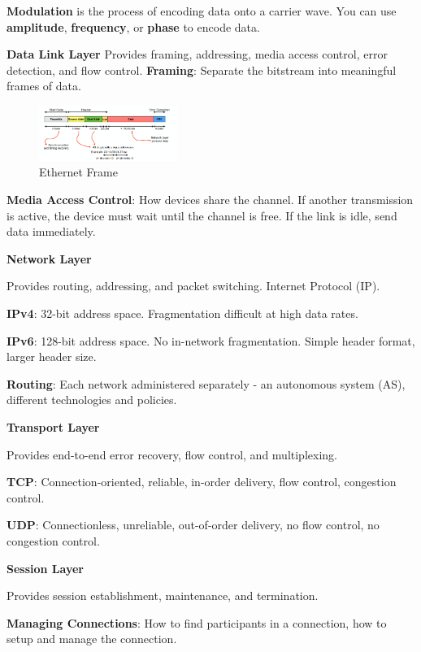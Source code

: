 \documentclass{article}
\begin{document}
\textbf{Modulation} is the process of encoding data onto a carrier wave. You can use \textbf{amplitude}, \textbf{frequency}, or \textbf{phase} to encode data.

\textbf{Data Link Layer}
Provides framing, addressing, media access control, error detection, and flow control.
\textbf{Framing}: Separate the bitstream into meaningful frames of data.

\begin{figure}[h]
    \centering
    \includegraphics[width=0.4\textwidth]{assets/ethernet-frame.png}
    \caption{Ethernet Frame}\label{fig:ethernet-frame}
\end{figure}

\textbf{Media Access Control}: How devices share the channel. If another transmission is active, the device must wait until the channel is free.
If the link is idle, send data immediately.

\textbf{Network Layer}

Provides routing, addressing, and packet switching. Internet Protocol (IP).

\textbf{IPv4}: 32-bit address space. Fragmentation difficult at high data rates.

\textbf{IPv6}: 128-bit address space. No in-network fragmentation. Simple header format, larger header size.

\textbf{Routing}: Each network administered separately {-} an autonomous system (AS), different technologies and policies.

\textbf{Transport Layer}

Provides end-to-end error recovery, flow control, and multiplexing.

\textbf{TCP}: Connection-oriented, reliable, in-order delivery, flow control, congestion control.

\textbf{UDP}: Connectionless, unreliable, out-of-order delivery, no flow control, no congestion control.

\textbf{Session Layer}

Provides session establishment, maintenance, and termination.

\textbf{Managing Connections}: How to find participants in a connection, how to setup and manage the connection.
\end{document}
